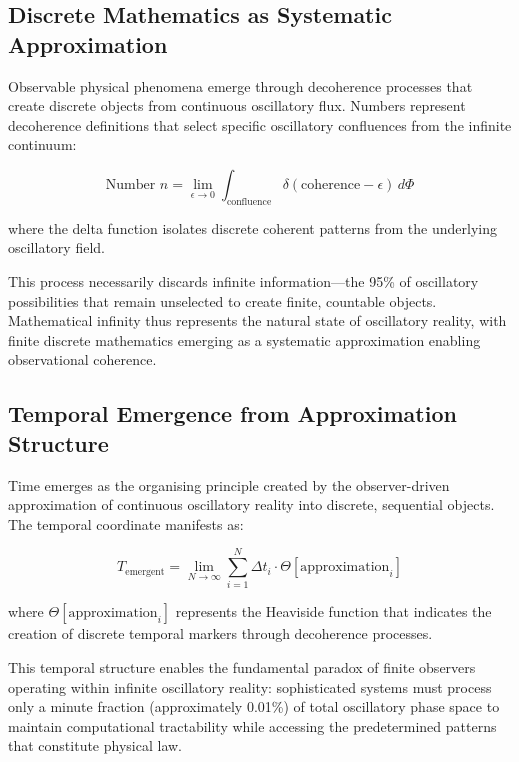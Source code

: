 \documentclass[12pt,a4paper]{article}
\begin{document}
\subsection{Discrete Mathematics as Systematic Approximation}

Observable physical phenomena emerge through decoherence processes that create discrete objects from continuous oscillatory flux. Numbers represent decoherence definitions that select specific oscillatory confluences from the infinite continuum:

\begin{equation}
\text{Number }n = \lim_{\epsilon \to 0} \int_{\text{confluence}} \delta(\text{coherence} - \epsilon) \, d\Phi
\end{equation}

where the delta function isolates discrete coherent patterns from the underlying oscillatory field.

This process necessarily discards infinite information—the 95\% of oscillatory possibilities that remain unselected to create finite, countable objects. Mathematical infinity thus represents the natural state of oscillatory reality, with finite discrete mathematics emerging as a systematic approximation enabling observational coherence.

\subsection{Temporal Emergence from Approximation Structure}

Time emerges as the organising principle created by the observer-driven approximation of continuous oscillatory reality into discrete, sequential objects. The temporal coordinate manifests as:

\begin{equation}
T_{\text{emergent}} = \lim_{N \to \infty} \sum_{i=1}^{N} \Delta t_i \cdot \Theta[\text{approximation}_i]
\end{equation}

where $\Theta[\text{approximation}_i]$ represents the Heaviside function that indicates the creation of discrete temporal markers through decoherence processes.

This temporal structure enables the fundamental paradox of finite observers operating within infinite oscillatory reality: sophisticated systems must process only a minute fraction (approximately 0.01\%) of total oscillatory phase space to maintain computational tractability while accessing the predetermined patterns that constitute physical law.
\end{document}
